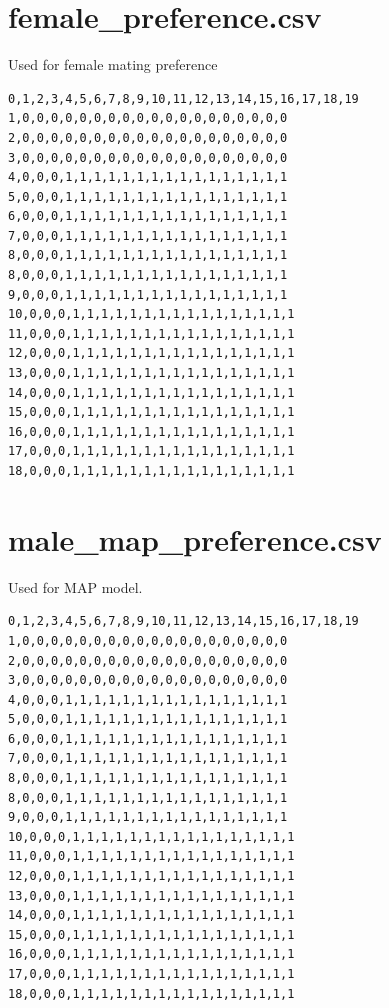 \documentclass[authoryearcitations]{UoYCSproject}
\begin{document}
\section{female\_preference.csv}
Used for female mating preference
\begin{framed}
\begin{verbatim}
0,1,2,3,4,5,6,7,8,9,10,11,12,13,14,15,16,17,18,19
1,0,0,0,0,0,0,0,0,0,0,0,0,0,0,0,0,0,0,0
2,0,0,0,0,0,0,0,0,0,0,0,0,0,0,0,0,0,0,0
3,0,0,0,0,0,0,0,0,0,0,0,0,0,0,0,0,0,0,0
4,0,0,0,1,1,1,1,1,1,1,1,1,1,1,1,1,1,1,1
5,0,0,0,1,1,1,1,1,1,1,1,1,1,1,1,1,1,1,1
6,0,0,0,1,1,1,1,1,1,1,1,1,1,1,1,1,1,1,1
7,0,0,0,1,1,1,1,1,1,1,1,1,1,1,1,1,1,1,1
8,0,0,0,1,1,1,1,1,1,1,1,1,1,1,1,1,1,1,1
8,0,0,0,1,1,1,1,1,1,1,1,1,1,1,1,1,1,1,1
9,0,0,0,1,1,1,1,1,1,1,1,1,1,1,1,1,1,1,1
10,0,0,0,1,1,1,1,1,1,1,1,1,1,1,1,1,1,1,1
11,0,0,0,1,1,1,1,1,1,1,1,1,1,1,1,1,1,1,1
12,0,0,0,1,1,1,1,1,1,1,1,1,1,1,1,1,1,1,1
13,0,0,0,1,1,1,1,1,1,1,1,1,1,1,1,1,1,1,1
14,0,0,0,1,1,1,1,1,1,1,1,1,1,1,1,1,1,1,1
15,0,0,0,1,1,1,1,1,1,1,1,1,1,1,1,1,1,1,1
16,0,0,0,1,1,1,1,1,1,1,1,1,1,1,1,1,1,1,1
17,0,0,0,1,1,1,1,1,1,1,1,1,1,1,1,1,1,1,1
18,0,0,0,1,1,1,1,1,1,1,1,1,1,1,1,1,1,1,1
\end{verbatim}
\end{framed}


\section{male\_map\_preference.csv}
Used for MAP model.
\begin{framed}
\begin{verbatim}
0,1,2,3,4,5,6,7,8,9,10,11,12,13,14,15,16,17,18,19
1,0,0,0,0,0,0,0,0,0,0,0,0,0,0,0,0,0,0,0
2,0,0,0,0,0,0,0,0,0,0,0,0,0,0,0,0,0,0,0
3,0,0,0,0,0,0,0,0,0,0,0,0,0,0,0,0,0,0,0
4,0,0,0,1,1,1,1,1,1,1,1,1,1,1,1,1,1,1,1
5,0,0,0,1,1,1,1,1,1,1,1,1,1,1,1,1,1,1,1
6,0,0,0,1,1,1,1,1,1,1,1,1,1,1,1,1,1,1,1
7,0,0,0,1,1,1,1,1,1,1,1,1,1,1,1,1,1,1,1
8,0,0,0,1,1,1,1,1,1,1,1,1,1,1,1,1,1,1,1
8,0,0,0,1,1,1,1,1,1,1,1,1,1,1,1,1,1,1,1
9,0,0,0,1,1,1,1,1,1,1,1,1,1,1,1,1,1,1,1
10,0,0,0,1,1,1,1,1,1,1,1,1,1,1,1,1,1,1,1
11,0,0,0,1,1,1,1,1,1,1,1,1,1,1,1,1,1,1,1
12,0,0,0,1,1,1,1,1,1,1,1,1,1,1,1,1,1,1,1
13,0,0,0,1,1,1,1,1,1,1,1,1,1,1,1,1,1,1,1
14,0,0,0,1,1,1,1,1,1,1,1,1,1,1,1,1,1,1,1
15,0,0,0,1,1,1,1,1,1,1,1,1,1,1,1,1,1,1,1
16,0,0,0,1,1,1,1,1,1,1,1,1,1,1,1,1,1,1,1
17,0,0,0,1,1,1,1,1,1,1,1,1,1,1,1,1,1,1,1
18,0,0,0,1,1,1,1,1,1,1,1,1,1,1,1,1,1,1,1
\end{verbatim}
\end{framed}
\end{document}
